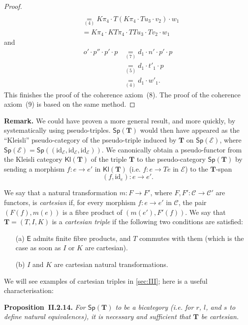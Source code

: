 \documentclass[fleqn]{article}
\newenvironment{itenv}[1]
  {\phantomsection\par\medskip\noindent\textbf{#1.}\itshape}
  {\par\medskip}
\newenvironment{rmenv}[1]
  {\phantomsection\par\medskip\noindent\textbf{#1.}\rmfamily}
  {\par\medskip}
\newcommand{\id}{\mathrm{id}}
\newcommand{\TT}{\mathbf{T}}
\newcommand{\cat}[1]{\mathcal{#1}}
\newcommand{\Cat}[1]{\mathsf{#1}}
\newcommand{\Kl}[1]{\Cat{Kl}(#1)}
\newcommand{\Sp}[1]{\Cat{Sp}(#1)}
\begin{document}
\begin{proof}
\[\begin{aligned}
    \\&\underset{(4)}{=} K\pi_4\cdot T(K\pi_4\cdot Tu_3\cdot v_2)\cdot w_1
    \\&= K\pi_4\cdot KT\pi_4\cdot TTu_3\cdot Tv_2\cdot w_1
    \end{aligned}
  \]
  and
  \[
    \begin{aligned}
      o'\cdot p''\cdot p'\cdot p
      &\underset{(7)}{=} d_1\cdot n'\cdot p'\cdot p
    \\&\underset{(5)}{=} d_1\cdot t'_1\cdot p
    \\&\underset{(4)}{=} d_1\cdot w'_1.
    \end{aligned}
  \]
  This finishes the proof of the coherence axiom~(8).
  The proof of the coherence axiom~(9) is based on the same method.
\end{proof}

\begin{rmenv}{Remark}
  We could have proven a more general result, and more quickly, by systematically using pseudo-triples.
  $\Sp{\TT}$ would then have appeared as the ``Kleisli'' pseudo-category of the pseudo-triple induced by $\TT$ on $\Sp{\cat{E}}$, where $\Sp{\cat{E}}=\Sp{(\id_\cat{E},\id_\cat{E},\id_\cat{E})}$.
  We canonically obtain a pseudo-functor from the Kleisli category $\Kl{\TT}$ of the triple $\TT$ to the pseudo-category $\Sp{\TT}$ by sending a morphism $f\colon e\to e'$ in $\Kl{\TT}$ (i.e. $f\colon e\to Te$ in $\cat{E}$) to the $\TT$-span
  \[
    (f,\id_e)\colon e\to e'.
  \]
\end{rmenv}

We say that a natural transformation $m\colon F\to F'$, where $F,F'\colon\cat{C}\to\cat{C}'$ are functors, is \emph{cartesian} if, for every morphism $f\colon e\to e'$ in $\cat{C}$, the pair $(F(f),m(e))$ is a fibre product of $(m(e'),F'(f))$.
We say that $\TT=(T,I,K)$ is a \emph{cartesian triple} if the following two conditions are satisfied:
\begin{enumerate}
  \item[(a)]
    $\Cat{E}$ admits finite fibre products, and $T$ commutes with them (which is the case as soon as $I$ or $K$ are cartesian).

  \item[(b)]
    $I$ and $K$ are cartesian natural transformations.
\end{enumerate}

We will see examples of cartesian triples in \cref{sec:III};
here is a useful characterisation:

\begin{itenv}{Proposition~II.2.14}
\label{proposition:II.2.14}
  For $\Sp{\TT}$ to be a bicategory (i.e. for $r$, $l$, and $s$ to define natural equivalences), it is necessary and sufficient that $\TT$ be cartesian.
\end{itenv}
\end{document}
